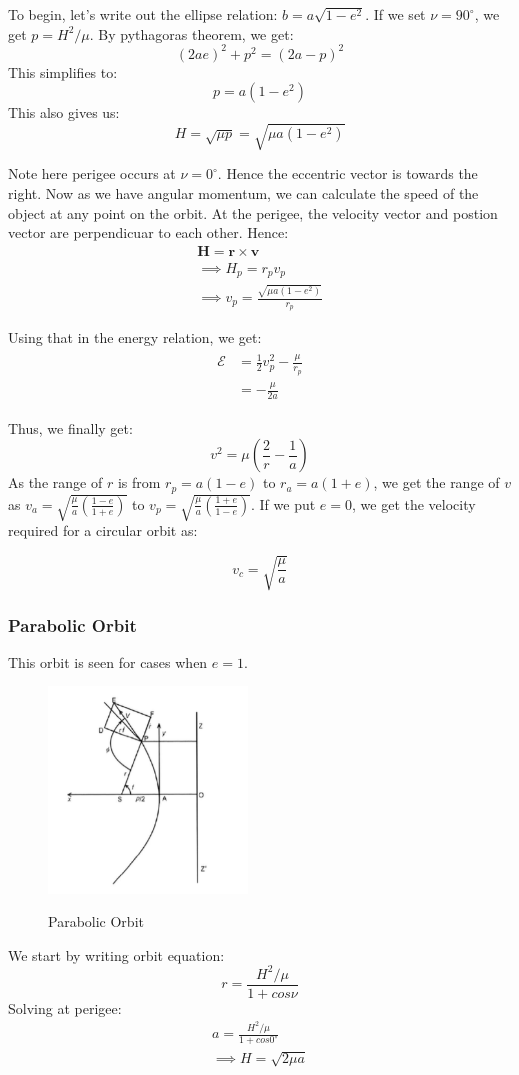 \documentclass[12pt, letterpaper]{article}
\begin{document}
To begin, let's write out the ellipse relation: $b = a\sqrt{1-e^2}$. If we set $\nu = 90^\circ$, we get $p = H^2/\mu$. By pythagoras theorem, we get:
\[
	(2ae)^2 + p^2 = (2a -p)^2
\] 
This simplifies to:
\[p=a(1-e^2)\]
This also gives us:
\[H = \sqrt{\mu p} = \sqrt{\mu a(1-e^2)}\]

Note here perigee occurs at $\nu = 0^\circ$. Hence the eccentric vector is towards the right. Now as we have angular momentum, we can calculate the speed of the object at any point on the orbit. At the perigee, the velocity vector and postion vector are perpendicuar to each other. Hence:
\begin{gather*}
	\mathbf{H} = \mathbf{r\times v}\\
	\implies H_p = r_pv_p\\
	\implies v_p = \frac{\sqrt{\mu a(1-e^2)}}{r_p}
\end{gather*}

Using that in the energy relation, we get:
\begin{gather*}
\begin{split}
	\mathcal{E} &= \frac{1}{2}v_p^2 - \frac{\mu}{r_p}\\
	&= - \frac{\mu}{2a}
\end{split}
\end{gather*}

Thus, we finally get:
\[ v^2  = \mu \left(\frac{2}{r} - \frac{1}{a}\right) \]
As the range of $r$ is from $r_p = a(1-e)$ to $r_a = a(1+e)$, we get the range of $v$ as $v_a = \sqrt{\frac{\mu}{a}\left(\frac{1-e}{1+e}\right)} $ to $v_p =  \sqrt{\frac{\mu}{a}\left(\frac{1+e}{1-e}\right)} $. If we put $e=0$, we get the velocity required for a circular orbit as:

\[ v_c = \sqrt{\frac{\mu}{a}} \]
\newpage
\subsubsection{Parabolic Orbit}
This orbit is seen for cases when $e=1$. 

\begin{figure}[ht]
	\centering
    \includegraphics[width = 200px]{parabola}
    \label{fig:parabola}
    \caption{Parabolic Orbit}
\end{figure}
We start by writing orbit equation:
\[ r = \frac{H^2/\mu}{1+cos\nu} \]
Solving at perigee:
\begin{gather*}
	a = \frac{H^2/\mu}{1+cos0^\circ}\\
	\implies H = \sqrt{2\mu a}
\end{gather*}
\end{document}
